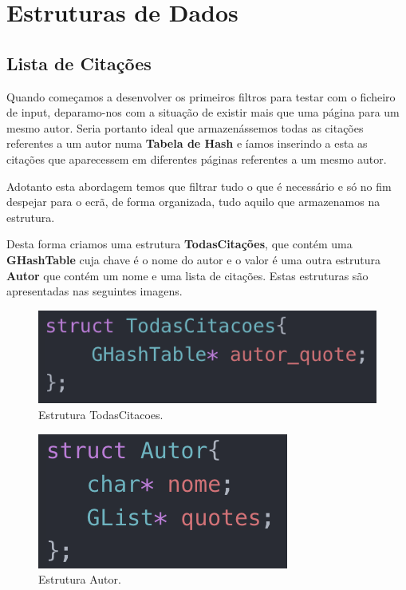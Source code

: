 \documentclass[11pt,a4paper]{report}
\begin{document}
\section{Estruturas de Dados}
\subsection{Lista de Citações}

Quando começamos a desenvolver os primeiros filtros para testar com o ficheiro de input, deparamo-nos com a situação de existir mais que uma página para um mesmo autor. Seria portanto ideal que armazenássemos todas as citações referentes a um autor numa \textbf{Tabela de Hash} e íamos inserindo a esta as citações que aparecessem em diferentes páginas referentes a um mesmo autor.

Adotanto esta abordagem temos que filtrar tudo o que é necessário e só no fim despejar para o ecrã, de forma organizada, tudo aquilo que armazenamos na estrutura.

Desta forma criamos uma estrutura \textbf{TodasCitações}, que contém uma \textbf{GHashTable} cuja chave é o nome do autor e o valor é uma outra estrutura \textbf{Autor} que contém um nome e uma lista de citações. Estas estruturas são apresentadas nas seguintes imagens.

\begin{figure}[H]
\centering
\includegraphics[scale=0.9]{TodasCitacoes.png}
\caption{Estrutura TodasCitacoes.}
\label{img:todas_citacoes}
\end{figure}

\begin{figure}[H]
\centering
\includegraphics[scale=0.9]{Autor.png}
\caption{Estrutura Autor.}
\label{img:autor}
\end{figure}
\end{document}

